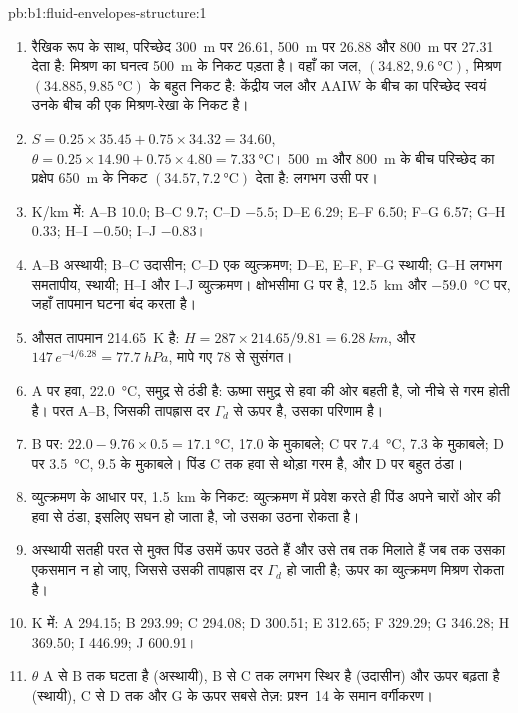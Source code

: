 \begin{solution}{pb:b1:fluid-envelopes-structure:1}
\begin{enumerate}
  \item रैखिक रूप के साथ, परिच्छेद \qty{300}{m} पर 26.61, \qty{500}{m} पर 26.88 और \qty{800}{m} पर 27.31 देता है: मिश्रण का घनत्व \qty{500}{m} के निकट पड़ता है। वहाँ का जल, $(34.82, \qty{9.6}{\celsius})$, मिश्रण $(34.885, \qty{9.85}{\celsius})$ के बहुत निकट है: केंद्रीय जल और AAIW के बीच का परिच्छेद स्वयं उनके बीच की एक मिश्रण-रेखा के निकट है।
  \item $S = 0.25 \times 35.45 + 0.75 \times 34.32 = 34.60$, $\theta = 0.25
        \times 14.90 + 0.75 \times 4.80 = \qty{7.33}{\celsius}$। \qty{500}{m} और \qty{800}{m} के बीच परिच्छेद का प्रक्षेप \qty{650}{m} के निकट $(34.57, \qty{7.2}{\celsius})$ देता है: लगभग उसी पर।
  \item \si{K/km} में: A--B 10.0; B--C 9.7; C--D $-5.5$; D--E 6.29; E--F 6.50;
        F--G 6.57; G--H 0.33; H--I $-0.50$; I--J $-0.83$।
  \item A--B अस्थायी; B--C उदासीन; C--D एक व्युत्क्रमण; D--E, E--F, F--G स्थायी; G--H लगभग समतापीय, स्थायी; H--I और I--J व्युत्क्रमण। क्षोभसीमा G पर है, \qty{12.5}{km} और \qty{-59.0}{\celsius} पर, जहाँ तापमान घटना बंद करता है।
  \item औसत तापमान \qty{214.65}{K} है: $H = 287 \times 214.65/9.81 =
        \qty{6.28}{km}$, और $147\,e^{-4/6.28} = \qty{77.7}{hPa}$, मापे गए 78 से सुसंगत।
  \item A पर हवा, \qty{22.0}{\celsius}, समुद्र से ठंडी है: ऊष्मा समुद्र से हवा की ओर बहती है, जो नीचे से गरम होती है। परत A--B, जिसकी तापह्रास दर $\Gamma_d$ से ऊपर है, उसका परिणाम है।
  \item B पर: $22.0 - 9.76 \times 0.5 = \qty{17.1}{\celsius}$, 17.0 के मुकाबले; C पर \qty{7.4}{\celsius}, 7.3 के मुकाबले; D पर \qty{3.5}{\celsius}, 9.5 के मुकाबले। पिंड C तक हवा से थोड़ा गरम है, और D पर बहुत ठंडा।
  \item व्युत्क्रमण के आधार पर, \qty{1.5}{km} के निकट: व्युत्क्रमण में प्रवेश करते ही पिंड अपने चारों ओर की हवा से ठंडा, इसलिए सघन हो जाता है, जो उसका उठना रोकता है।
  \item अस्थायी सतही परत से मुक्त पिंड उसमें ऊपर उठते हैं और उसे तब तक मिलाते हैं जब तक उसका  एकसमान न हो जाए, जिससे उसकी तापह्रास दर $\Gamma_d$ हो जाती है; ऊपर का व्युत्क्रमण मिश्रण रोकता है।
  \item K में: A 294.15; B 293.99; C 294.08; D 300.51; E 312.65; F 329.29; G
        346.28; H 369.50; I 446.99; J 600.91।
  \item $\theta$ A से B तक घटता है (अस्थायी), B से C तक लगभग स्थिर है (उदासीन) और ऊपर बढ़ता है (स्थायी), C से D तक और G के ऊपर सबसे तेज़: प्रश्न~14 के समान वर्गीकरण।

\end{enumerate}
\end{solution}
